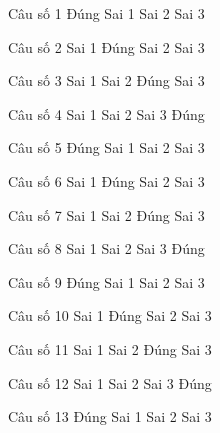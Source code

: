 \begin{ex}
Câu số 1
\choice
{\True Đúng}
{Sai 1}
{Sai 2}
{Sai 3}
\end{ex}

\begin{ex}
Câu số 2
\choice
{Sai 1}
{\True Đúng}
{Sai 2}
{Sai 3}
\end{ex}

\begin{ex}
Câu số 3
\choice
{Sai 1}
{Sai 2}
{\True Đúng}
{Sai 3}
\end{ex}

\begin{ex}
Câu số 4
\choice
{Sai 1}
{Sai 2}
{Sai 3}
{\True Đúng}
\end{ex}
\begin{ex}
Câu số 5
\choice
{\True Đúng}
{Sai 1}
{Sai 2}
{Sai 3}
\end{ex}

\begin{ex}
Câu số 6
\choice
{Sai 1}
{\True Đúng}
{Sai 2}
{Sai 3}
\end{ex}

\begin{ex}
Câu số 7
\choice
{Sai 1}
{Sai 2}
{\True Đúng}
{Sai 3}
\end{ex}

\begin{ex}
Câu số 8
\choice
{Sai 1}
{Sai 2}
{Sai 3}
{\True Đúng}
\end{ex}
\begin{ex}
Câu số 9
\choice
{\True Đúng}
{Sai 1}
{Sai 2}
{Sai 3}
\end{ex}

\begin{ex}
Câu số 10
\choice
{Sai 1}
{\True Đúng}
{Sai 2}
{Sai 3}
\end{ex}

\begin{ex}
Câu số 11
\choice
{Sai 1}
{Sai 2}
{\True Đúng}
{Sai 3}
\end{ex}

\begin{ex}
Câu số 12
\choice
{Sai 1}
{Sai 2}
{Sai 3}
{\True Đúng}
\end{ex}
\begin{ex}
Câu số 13
\choice
{\True Đúng}
{Sai 1}
{Sai 2}
{Sai 3}
\end{ex}

